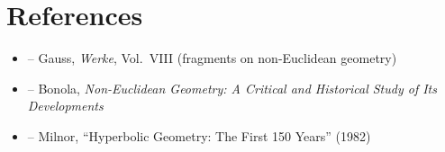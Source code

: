 \section{References}

\begin{itemize}
    \item \cite{gauss-works} -- Gauss, \textit{Werke}, Vol.~VIII (fragments on non-Euclidean geometry)
    \item \cite{bonola} -- Bonola, \textit{Non-Euclidean Geometry: A Critical and Historical Study of Its Developments}
    \item \cite{milnor-hyperbolic} -- Milnor, ``Hyperbolic Geometry: The First 150 Years'' (1982)
\end{itemize}
